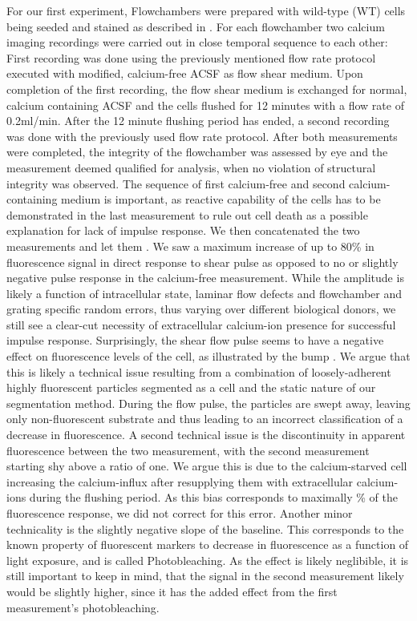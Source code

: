 For our first experiment, Flowchambers were prepared with wild-type (WT) cells being seeded and stained as described in . For each flowchamber two calcium imaging recordings were carried out in close temporal sequence to each other: First recording was done using the previously mentioned flow rate protocol executed with modified, calcium-free ACSF as flow shear medium. Upon completion of the first recording, the flow shear medium is exchanged for normal, calcium containing ACSF and the cells flushed for 12 minutes with a flow rate of 0.2ml/min. After the 12 minute flushing period has ended, a second recording was done with the previously used flow rate protocol. After both measurements were completed, the integrity of the flowchamber was assessed by eye and the measurement deemed qualified for analysis, when no violation of structural integrity was observed. The sequence of first calcium-free and second calcium-containing medium is important, as reactive capability of the cells has to be demonstrated in the last measurement to rule out cell death as a possible explanation for lack of impulse response. We then concatenated the two measurements and let them . We saw a maximum increase of up to 80\% in fluorescence signal in direct response to shear pulse as opposed to no or slightly negative pulse response in the calcium-free measurement. While the amplitude is likely a function of intracellular state, laminar flow defects and flowchamber and grating specific random errors, thus varying over different biological donors, we still see a clear-cut necessity of extracellular calcium-ion presence for successful impulse response. Surprisingly, the shear flow pulse seems to have a negative effect on fluorescence levels of the cell, as illustrated by the bump . We argue that this is likely a technical issue resulting from a combination of loosely-adherent highly fluorescent particles segmented as a cell and the static nature of our segmentation method. During the flow pulse, the particles are swept away, leaving only non-fluorescent substrate and thus leading to an incorrect classification of a decrease in fluorescence. A second technical issue is the discontinuity in apparent fluorescence between the two measurement, with the second measurement starting shy above a ratio of one. We argue this is due to the calcium-starved cell increasing the calcium-influx after resupplying them with extracellular calcium-ions during the flushing period. As this bias corresponds to maximally \% of the fluorescence response, we did not correct for this error. Another minor technicality is the slightly negative slope of the baseline. This corresponds to the known property of fluorescent markers to decrease in fluorescence as a function of light exposure, and is called Photobleaching. As the effect is likely neglibible, it is still important to keep in mind, that the signal in the second measurement likely would be slightly higher, since it has the added effect from the first measurement's photobleaching.

